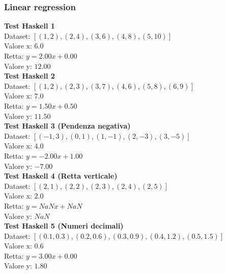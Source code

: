\documentclass[11pt]{article}
\theoremstyle{definition}
\begin{document}
\subsubsection{Linear regression}
\noindent
\textbf{Test Haskell 1}\\
Dataset: $[(1, 2), (2, 4), (3, 6), (4, 8), (5, 10)]$\\
Valore x: $6.0$\\
Retta: $y = 2.00x + 0.00$\\
Valore y: $12.00$\\
\newline
\textbf{Test Haskell 2}\\
Dataset: $[(1, 2), (2, 3), (3, 7), (4, 6), (5, 8), (6, 9)]$\\
Valore x: $7.0$\\
Retta: $y = 1.50x + 0.50$\\
Valore y: $11.50$\\
\newline
\textbf{Test Haskell 3 (Pendenza negativa)}\\
Dataset: $[(-1, 3), (0, 1), (1, -1), (2, -3), (3, -5)]$\\
Valore x: $4.0$\\
Retta: $y = -2.00x + 1.00$\\
Valore y: $-7.00$\\
\newline
\textbf{Test Haskell 4 (Retta verticale)}\\
Dataset: $[(2, 1), (2, 2), (2, 3), (2, 4), (2, 5)]$\\
Valore x: $2.0$\\
Retta: $y = NaNx + NaN$\\
Valore y: $NaN$\\
\newline
\textbf{Test Haskell 5 (Numeri decimali)}\\
Dataset: $[(0.1, 0.3), (0.2, 0.6), (0.3, 0.9), (0.4, 1.2), (0.5, 1.5)]$\\
Valore x: $0.6$\\
Retta: $y = 3.00x + 0.00$\\
Valore y: $1.80$
\end{document}
